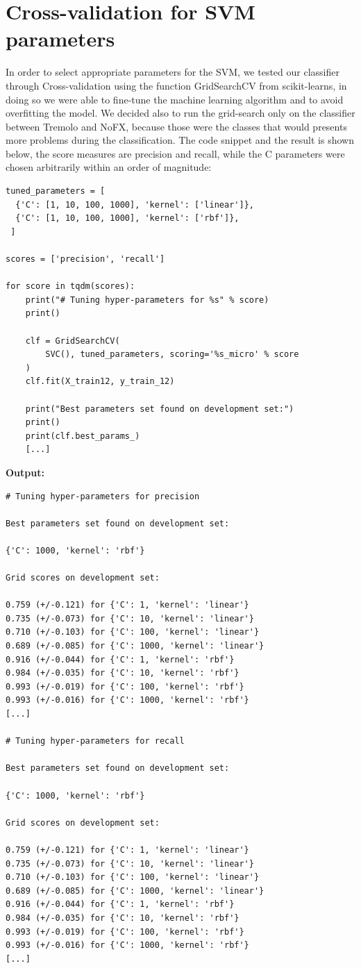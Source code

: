 \documentclass{article}
\begin{document}
\section{Cross-validation for SVM parameters}
In order to select appropriate parameters for the SVM, we tested our classifier through Cross-validation using the function GridSearchCV from scikit-learns, in doing so we were able to fine-tune the machine learning algorithm and to avoid overfitting the model. We decided also to run the grid-search only on the classifier between Tremolo and NoFX, because those were the classes that would presents more problems during the classification. The code snippet and the result is shown below, the score measures are precision and recall, while the C parameters were chosen arbitrarily within an order of magnitude:
\begin{verbatim}
tuned_parameters = [
  {'C': [1, 10, 100, 1000], 'kernel': ['linear']},
  {'C': [1, 10, 100, 1000], 'kernel': ['rbf']},
 ]

scores = ['precision', 'recall']

for score in tqdm(scores):
    print("# Tuning hyper-parameters for %s" % score)
    print()

    clf = GridSearchCV(
        SVC(), tuned_parameters, scoring='%s_micro' % score
    )
    clf.fit(X_train12, y_train_12)

    print("Best parameters set found on development set:")
    print()
    print(clf.best_params_)
    [...]
\end{verbatim}
\hfill \break
\textbf{Output:}

\begin{verbatim}
# Tuning hyper-parameters for precision

Best parameters set found on development set:

{'C': 1000, 'kernel': 'rbf'}

Grid scores on development set:

0.759 (+/-0.121) for {'C': 1, 'kernel': 'linear'}
0.735 (+/-0.073) for {'C': 10, 'kernel': 'linear'}
0.710 (+/-0.103) for {'C': 100, 'kernel': 'linear'}
0.689 (+/-0.085) for {'C': 1000, 'kernel': 'linear'}
0.916 (+/-0.044) for {'C': 1, 'kernel': 'rbf'}
0.984 (+/-0.035) for {'C': 10, 'kernel': 'rbf'}
0.993 (+/-0.019) for {'C': 100, 'kernel': 'rbf'}
0.993 (+/-0.016) for {'C': 1000, 'kernel': 'rbf'}
[...]

# Tuning hyper-parameters for recall

Best parameters set found on development set:

{'C': 1000, 'kernel': 'rbf'}

Grid scores on development set:

0.759 (+/-0.121) for {'C': 1, 'kernel': 'linear'}
0.735 (+/-0.073) for {'C': 10, 'kernel': 'linear'}
0.710 (+/-0.103) for {'C': 100, 'kernel': 'linear'}
0.689 (+/-0.085) for {'C': 1000, 'kernel': 'linear'}
0.916 (+/-0.044) for {'C': 1, 'kernel': 'rbf'}
0.984 (+/-0.035) for {'C': 10, 'kernel': 'rbf'}
0.993 (+/-0.019) for {'C': 100, 'kernel': 'rbf'}
0.993 (+/-0.016) for {'C': 1000, 'kernel': 'rbf'}
[...]
\end{verbatim}
\newpage
\end{document}
